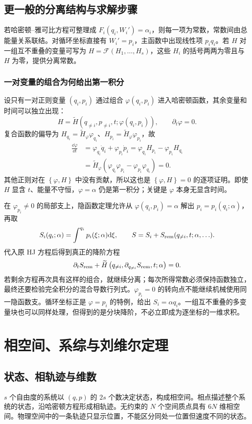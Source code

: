 \documentclass[UTF8,zihao=-4,fontset=fandol,a4paper]{ctexart}
\newcommand{\PB}[2]{\left\{#1,#2\right\}}
\begin{document}
\subsection{更一般的分离结构与求解步骤}
若哈密顿--雅可比方程可整理成 $F_i(q_i,W_i')=\alpha_i$，则每一项为常数，常数间由总能量关系联结。对循环坐标直接有 $W_i'=p_i$，主函数中出现线性项 $p_iq_i$。若 $H$ 对一组互不重叠的变量可写为 $H=\mathcal F(H_1,\ldots,H_s)$，这些 $H_i$ 的括号两两为零且与 $H$ 为零，提供分离常数。

\subsubsection*{一对变量的组合为何给出第一积分}
设只有一对正则变量 $(q_i,p_i)$ 通过组合 $\varphi(q_i,p_i)$ 进入哈密顿函数，其余变量和时间可以独立出现：
\[
H=\widetilde H(q_{\ne i},p_{\ne i},t;\varphi(q_i,p_i)),
\qquad \partial_t\varphi=0.
\]
复合函数的偏导为 $H_{q_i}=\widetilde H_{\varphi}\varphi_{q_i}$、$H_{p_i}=\widetilde H_{\varphi}\varphi_{p_i}$，故
\begin{align*}
\frac{\dd\varphi}{\dd t}
&=\varphi_{q_i}\dot q_i+\varphi_{p_i}\dot p_i
=\varphi_{q_i}H_{p_i}-\varphi_{p_i}H_{q_i}\\
&=\widetilde H_{\varphi}
(\varphi_{q_i}\varphi_{p_i}-\varphi_{p_i}\varphi_{q_i})=0.
\end{align*}
其他正则对在 $\PB{\varphi}{H}$ 中没有贡献，所以这也是 $\PB{\varphi}{H}=0$ 的逐项证明。即使 $H$ 显含 $t$、能量不守恒，$\varphi=\alpha$ 仍是第一积分；关键是 $\varphi$ 本身无显含时间。

在 $\varphi_{p_i}\ne0$ 的局部支上，隐函数定理允许从 $\varphi(q_i,p_i)=\alpha$ 解出 $p_i=p_i(q_i;\alpha)$，再取
\[
S_i(q_i;\alpha)=\int^{q_i}p_i(\xi;\alpha)\mathrm d\xi,
\qquad
S=S_i+S_{\rm rem}(q_{\ne i},t;\alpha,\ldots).
\]
代入原 HJ 方程后得到真正的降阶方程
\[
\partial_t S_{\rm rem}
+\widetilde H\left(q_{\ne i},\partial_{q_{\ne i}}S_{\rm rem},t;\alpha\right)=0.
\]
若剩余方程再次具有这样的组合，就继续分离；每次所得常数必须保持函数独立，最终还要检验完全积分的混合导数行列式。$\varphi_{p_i}=0$ 的转向点不能继续机械使用同一隐函数支。循环坐标正是 $\varphi=p_i$ 的特例，给出 $S_i=\alpha q_i$。一组互不重叠的多变量块也可以同样处理，但得到的是分块降阶，不必立即成为逐坐标的一维求积。




\section{相空间、系综与刘维尔定理}\label{sec:liouville}
\subsection{状态、相轨迹与维数}
$s$ 个自由度的系统以 $(q,p)$ 的 $2s$ 个数决定状态，构成相空间。相点描述整个系统的状态，沿哈密顿方程形成相轨迹。无约束的 $N$ 个空间质点具有 $6N$ 维相空间。物理空间中的一条轨迹只显示位置，不能区分同处一位置但速度不同的状态。
\end{document}
